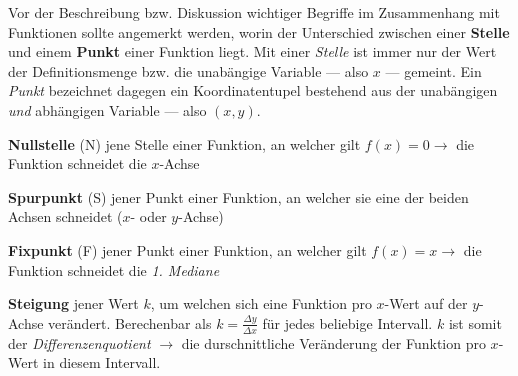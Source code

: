 
Vor der Beschreibung bzw. Diskussion wichtiger Begriffe im Zusammenhang mit Funktionen sollte angemerkt werden, worin der Unterschied zwischen einer \textbf{Stelle} und einem \textbf{Punkt} einer Funktion liegt. Mit einer \emph{Stelle} ist immer nur der Wert der Definitionsmenge bzw. die unab\"{a}ngige Variable --- also $x$ --- gemeint. Ein \emph{Punkt} bezeichnet dagegen ein Koordinatentupel bestehend aus der unab\"{a}ngigen \emph{und} abh\"{a}ngigen Variable --- also $(x, y)$.

\textbf{Nullstelle} (N)  jene Stelle einer Funktion, an welcher gilt $f(x) = 0 \rightarrow$ die Funktion schneidet die $x$-Achse

\textbf{Spurpunkt} (S)  jener Punkt einer Funktion, an welcher sie eine der beiden Achsen schneidet ($x$- oder $y$-Achse)

\textbf{Fixpunkt} (F)  jener Punkt einer Funktion, an welcher gilt $f(x) = x \rightarrow$ die Funktion schneidet die \emph{1. Mediane}

\textbf{Steigung}  jener Wert $k$, um welchen sich eine Funktion pro $x$-Wert auf der $y$-Achse ver\"{a}ndert. Berechenbar als $k = \frac{\Delta y}{\Delta x}$ f\"{u}r jedes beliebige Intervall. $k$ ist somit der \emph{Differenzenquotient} $\rightarrow$ die durschnittliche Ver\"{a}nderung der Funktion pro $x$-Wert in diesem Intervall.

\begin{figure}[h!]
	\centering
\end{figure}

